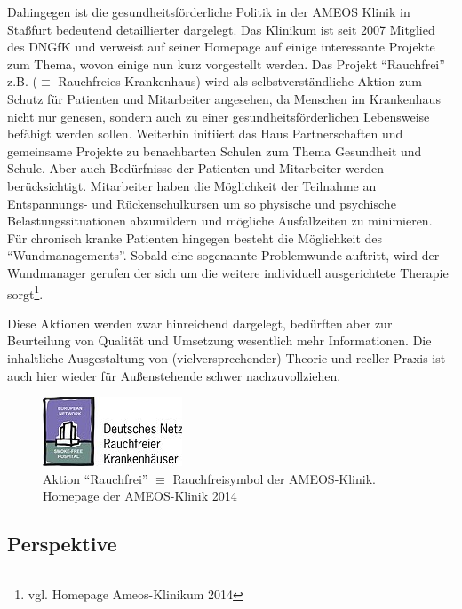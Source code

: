 Dahingegen ist die gesundheitsförderliche Politik in der AMEOS Klinik in Staßfurt bedeutend detaillierter dargelegt. Das Klinikum ist seit 2007 Mitglied des DNGfK und verweist auf seiner Homepage auf einige interessante Projekte zum Thema, wovon einige nun kurz vorgestellt werden. Das Projekt "`Rauchfrei"' z.B. ($\equiv$ Rauchfreies Krankenhaus) wird als selbstverständliche Aktion zum Schutz für Patienten und Mitarbeiter angesehen, da Menschen im Krankenhaus nicht nur genesen, sondern auch zu einer gesundheitsförderlichen Lebensweise befähigt werden sollen. Weiterhin initiiert das Haus Partnerschaften und gemeinsame Projekte zu benachbarten Schulen zum Thema Gesundheit und Schule. Aber auch Bedürfnisse der Patienten und Mitarbeiter werden berücksichtigt. Mitarbeiter haben die Möglichkeit der Teilnahme an Entspannungs- und Rückenschulkursen um so physische und psychische Belastungssituationen abzumildern und mögliche Ausfallzeiten zu minimieren. Für chronisch kranke Patienten hingegen besteht die Möglichkeit des "`Wundmanagements"'. Sobald eine sogenannte Problemwunde auftritt, wird der Wundmanager gerufen der sich um die weitere individuell ausgerichtete Therapie sorgt\footnote{vgl. Homepage Ameos-Klinikum 2014}.

Diese Aktionen werden zwar hinreichend dargelegt, bedürften aber zur Beurteilung von Qualität und Umsetzung wesentlich mehr Informationen. Die inhaltliche Ausgestaltung von (vielversprechender) Theorie und reeller Praxis ist auch hier wieder für Außenstehende schwer nachzuvollziehen.

\begin{figure}[h]
	\centering
		\includegraphics[scale=2.75]{rauchfreiymbol.jpg}
	\caption{Aktion "`Rauchfrei"' $\equiv$ Rauchfreisymbol der AMEOS-Klinik. Homepage der AMEOS-Klinik 2014}
	\label{fig:rauchfreiymbol}
\end{figure}

\subsection{Perspektive}
\label{sec:Perspektive}

